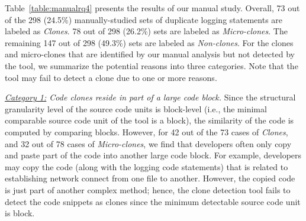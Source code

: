 Table~\ref{table:manualrq4} presents the results of our manual study. Overall, 73 out of the 298 (24.5\%) manually-studied sets of duplicate logging statements are labeled as {\em Clones}. 78 out of 298 (26.2\%) sets are labeled as {\em Micro-clones}. The remaining 147 out of 298 (49.3\%) sets are labeled as {\em Non-clones}.
For the clones and micro-clones that are identified by our manual analysis but not detected by the tool, we summarize the potential reasons into three categories. Note that the tool may fail to detect a clone due to one or more reasons.

{\em \underline{Category 1:} Code clones reside in part of a large code block.} Since the structural granularity level of the source code units is block-level (i.e., the minimal comparable source code unit of the tool is a block), the similarity of the code is computed by comparing blocks. However, for 42 out of the 73 cases of {\em Clones}, and 32 out of 78 cases of {\em Micro-clones}, we find that developers often only copy and paste part of the code into another large code block. For example, developers may copy the code (along with the logging code statements) that is related to establishing network connect from one file to another. However, the copied code is just part of another complex method; hence, the clone detection tool fails to detect the code snippets as clones since the minimum detectable source code unit is block.


